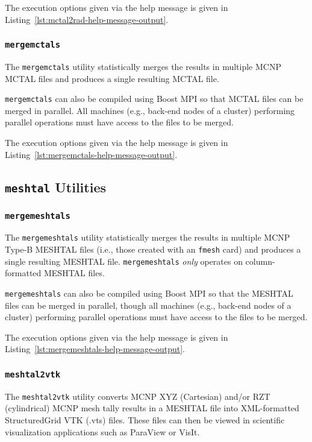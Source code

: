 \documentclass[11pt]{article}
\begin{document}
The execution options given via the help message is given in
Listing~\ref{lst:mctal2rad-help-message-output}.

\subsubsection{\texttt{mergemctals}}\label{sec:mergemctals}

The \texttt{mergemctals} utility statistically merges the results in
multiple MCNP MCTAL files and produces a single resulting MCTAL file.

\texttt{mergemctals} can also be compiled using Boost MPI so that MCTAL
files can be merged in parallel. All machines (e.g., back-end nodes of a
cluster) performing parallel operations must have access to the files to
be merged.

The execution options given via the help message is given in
Listing~\ref{lst:mergemctals-help-message-output}.

\subsection{\texttt{meshtal} Utilities}

\subsubsection{\texttt{mergemeshtals}}\label{sec:mergemeshtals}

The \texttt{mergemeshtals} utility statistically merges the results in multiple
MCNP Type-B MESHTAL files (i.e., those created with an \texttt{fmesh} card) and
produces a single resulting MESHTAL file. \texttt{mergemeshtals} \emph{only}
operates on column-formatted MESHTAL files.

\texttt{mergemeshtals} can also be compiled using Boost MPI so that the MESHTAL
files can be merged in parallel, though all machines (e.g., back-end nodes of a
cluster) performing parallel operations must have access to the files to be
merged.

The execution options given via the help message is given in
Listing~\ref{lst:mergemeshtals-help-message-output}.

\subsubsection{\texttt{meshtal2vtk}}\label{sec:meshtal2vtk}

The \texttt{meshtal2vtk} utility converts MCNP XYZ (Cartesian) and/or RZT
(cylindrical) MCNP mesh tally results in a MESHTAL file into XML-formatted
StructuredGrid VTK (.vts) files. These files can then be viewed in scientific
visualization applications such as ParaView or VisIt.
\end{document}
